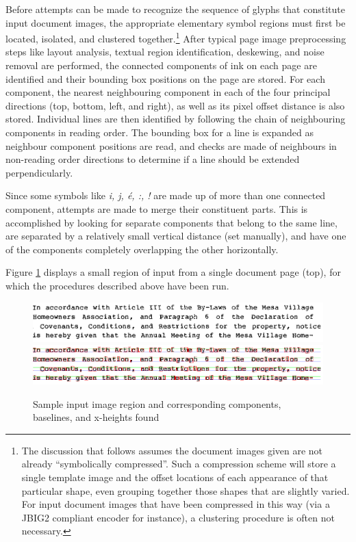 \documentclass[times, 10pt,twocolumn]{article}
\begin{document}

Before attempts can be made to recognize the sequence of glyphs that 
constitute input document images, the appropriate elementary symbol regions 
must first be located, isolated, and clustered together.\footnote{The
discussion that follows assumes the document images given are not
already ``symbolically compressed''. Such a compression scheme will
store a single template image and the offset locations of each
appearance of that particular shape, even grouping together
those shapes that are slightly varied.  For input document images that
have been compressed in this way (via a JBIG2 compliant encoder 
for instance), a clustering procedure is often not necessary.}
After typical page image preprocessing steps like layout analysis, textual
region identification, deskewing, and noise removal are performed, the
connected components of ink on each page are identified and their bounding box
positions on the page are stored.  For each component, the nearest neighbouring
component in each of the four principal directions (top, bottom, left, and
right), as well as its pixel offset distance is also stored.  Individual lines
are then identified by following the chain of neighbouring components in
reading order.  The bounding box for a line is expanded as neighbour
component positions are read, and checks are made of neighbours in non-reading
order directions to determine if a line should be extended perpendicularly.

Since some symbols like {\em i, j, \'{e}, :, !} are made up of more than one
connected component, attempts are made to merge their constituent parts.  This
is accomplished by looking for separate components that belong to the same
line, are separated by a relatively small vertical distance (set manually), and
have one of the components completely overlapping the other horizontally.

Figure \ref{inimg_fig} displays a small region of input from a single document
page (top), for which the procedures described above have been run.

\begin{figure}[ht]
  \centering
  \includegraphics[scale=1]{figures/input_lines}
  \includegraphics[scale=1]{figures/line_comps}
  \caption{Sample input image region and corresponding components, baselines,
           and x-heights found}
  \label{inimg_fig}
\end{figure}
\end{document}
